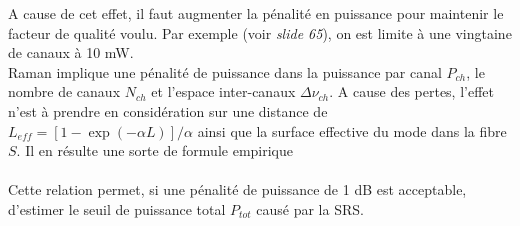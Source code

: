 A cause de cet effet, il faut augmenter la pénalité en puissance pour maintenir le facteur de 
qualité voulu. Par exemple (voir \textit{slide 65}), on est limite à une vingtaine de canaux à
10 mW.\\

Raman implique une pénalité de puissance dans la puissance par canal $P_{ch}$, le nombre de 
canaux $N_{ch}$ et l'espace inter-canaux $\Delta \nu_{ch}$. A cause des pertes, l'effet n'est
à prendre en considération sur une distance de $L_{eff}=[1-\exp(-\alpha L)]/\alpha$ ainsi 
que la surface effective du mode dans la fibre $S$. Il en résulte une sorte de formule
empirique\\

\ \\

Cette relation permet, si une pénalité de puissance de 1 dB est acceptable, d'estimer le seuil
de puissance total $P_{tot}$ causé par la SRS. 


